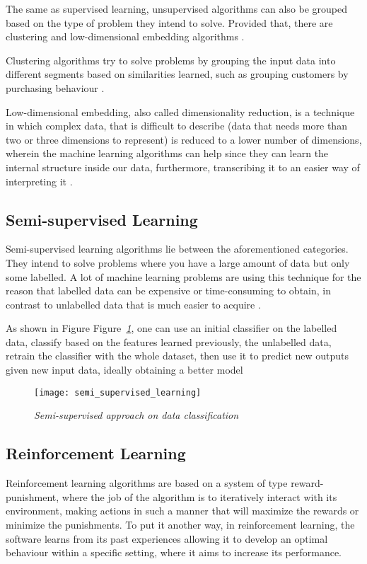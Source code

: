 The same as supervised learning, unsupervised algorithms can also be grouped
based on the type of problem they intend to solve. Provided that,
there are clustering and low-dimensional embedding algorithms \cite{amai}.

Clustering algorithms try to solve problems by grouping the input data
into different segments based on similarities learned,
such as grouping customers by purchasing behaviour \cite{brownlee2016master}.


Low-dimensional embedding, also called dimensionality reduction,
is a technique in which complex data, that is difficult to describe
(data that needs more than two or three dimensions to represent)
is reduced to a lower number of dimensions,
wherein the machine learning algorithms can help
since they can learn the internal structure inside our data, furthermore,
transcribing it to an easier way of interpreting it \cite{amai}.


\subsection{Semi-supervised Learning}
Semi-supervised learning algorithms lie between the aforementioned categories.
They intend to solve problems where you have a large amount of data but only some labelled.
A lot of machine learning problems are using this technique for the reason that
labelled data can be expensive or time-consuming to obtain,
in contrast to unlabelled data that is much easier to acquire \cite{brownlee2016master}.

As shown in Figure Figure\emph{~\ref{fig:semi_supervised_learning}}, one can use an initial classifier on the labelled data,
classify based on the features learned previously, the unlabelled data,
retrain the classifier with the whole dataset,
then use it to predict new outputs given new input data, ideally obtaining a better model \cite{lotte2015}

\begin{figure}[h]
    \centering
    \texttt{[image: semi\_supervised\_learning]}
    \caption{\emph{Semi-supervised approach on data classification \cite{lotte2015}}}
    \label{fig:semi_supervised_learning}
\end{figure}

\subsection{Reinforcement Learning}
Reinforcement learning algorithms are based on a system of type reward-punishment,
where the job of the algorithm is to iteratively interact with its environment,
making actions in such a manner that will maximize the rewards or minimize the punishments.
To put it another way, in reinforcement learning,
the software learns from its past experiences allowing it to develop an optimal
behaviour within a specific setting, where it aims to increase its performance.

